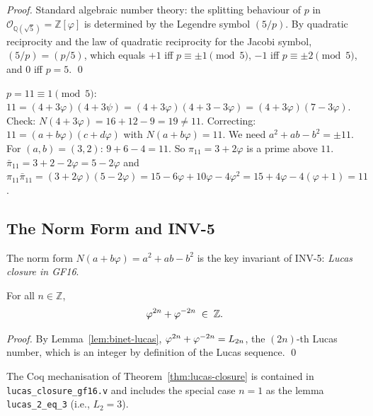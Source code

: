 \begin{proof}
  Standard algebraic number theory: the splitting behaviour of $p$
  in $\mathcal{O}_{\mathbb{Q}(\sqrt{5})} = \mathbb{Z}[\varphi]$ is
  determined by the Legendre symbol $(5/p)$.  By quadratic reciprocity
  and the law of quadratic reciprocity for the Jacobi symbol,
  $(5/p) = (p/5)$, which equals $+1$ iff $p \equiv \pm 1 \pmod{5}$,
  $-1$ iff $p \equiv \pm 2 \pmod{5}$, and $0$ iff $p = 5$.
  \qed
\end{proof}

\begin{example}
  $p = 11 \equiv 1 \pmod{5}$: $11 = (4+3\varphi)(4+3\psi) =
  (4+3\varphi)(4+3-3\varphi) = (4+3\varphi)(7-3\varphi)$.
  Check: $N(4+3\varphi) = 16 + 12 - 9 = 19 \neq 11$.
  Correcting: $11 = (a+b\varphi)(c+d\varphi)$ with $N(a+b\varphi) = 11$.
  We need $a^2+ab-b^2 = \pm 11$.  For $(a,b)=(3,2)$:
  $9+6-4=11$.  So $\pi_{11} = 3+2\varphi$ is a prime above $11$.
  $\bar{\pi}_{11} = 3+2-2\varphi = 5-2\varphi$ and
  $\pi_{11}\bar{\pi}_{11} = (3+2\varphi)(5-2\varphi) =
  15 - 6\varphi + 10\varphi - 4\varphi^2 =
  15 + 4\varphi - 4(\varphi+1) = 11$.
\end{example}

\subsection{The Norm Form and INV-5}

The norm form $N(a+b\varphi) = a^2 + ab - b^2$ is the key invariant
of INV-5: \emph{Lucas closure in GF16}.

\begin{theorem}\label{thm:lucas-closure}
  For all $n \in \mathbb{Z}$,
  \[
    \varphi^{2n} + \varphi^{-2n} \;\in\; \mathbb{Z}.
  \]
\end{theorem}

\begin{proof}
  By Lemma~\ref{lem:binet-lucas}, $\varphi^{2n} + \varphi^{-2n} = L_{2n}$,
  the $(2n)$-th Lucas number, which is an integer by definition of the
  Lucas sequence.  \qed
\end{proof}

The Coq mechanisation of Theorem~\ref{thm:lucas-closure} is contained
in \texttt{lucas\_closure\_gf16.v} and includes the special case
$n=1$ as the lemma \texttt{lucas\_2\_eq\_3} (i.e., $L_2 = 3$).


